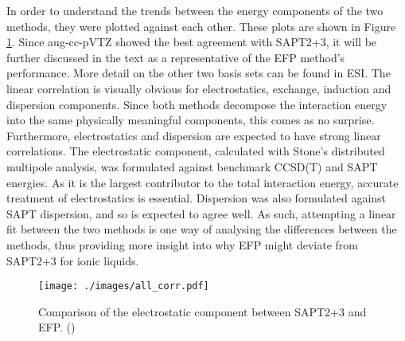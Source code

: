 

In order to understand the trends between the energy components of the two methods, they were plotted against each other. 
These plots are shown in Figure \ref{fig:sapt-efp-corr-all}.
Since aug-cc-pVTZ showed the best agreement with SAPT2+3,  it will be further discussed in the text as a representative of the EFP method's performance.
More detail on the other two basis sets can be found in ESI.
The linear correlation is visually obvious for electrostatics, exchange, induction and dispersion components.
Since both methods decompose the interaction energy into the same physically meaningful components, this comes as no surprise.
Furthermore, electrostatics and dispersion are expected to have strong linear correlations.
The electrostatic component, calculated with Stone's distributed multipole analysis, was formulated against benchmark CCSD(T) and SAPT energies.
\cite{Slipchenko2007a}
As it is the largest contributor to the total interaction energy, accurate treatment of electrostatics is essential.
Dispersion was also formulated against SAPT dispersion, and so is expected to agree well.
\cite{Adamovic2005a}
As such, attempting a linear fit between the two methods is one way of analysing the differences between the methods, thus providing more insight into why EFP might deviate from SAPT2+3 for ionic liquids.


\begin{figure}
    \caption{Comparison of the electrostatic component between SAPT2+3 and EFP. (\enUnit)}
    \label{fig:sapt-efp-corr-all}
    \centering
    \texttt{[image: ./images/all\_corr.pdf]}
\end{figure}


